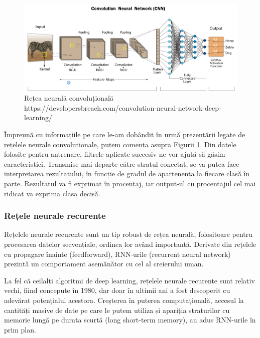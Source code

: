\documentclass[a4paper, 12pt]{report}
\begin{document}
	\clearpage
	\begin{figure}[h]
		\begin{center}
			\includegraphics[scale=0.29]{images/cnn.png}
		\end{center}
		\caption{Rețea neurală convoluțională\newline
			\hspace{\linewidth}https://developersbreach.com/convolution-neural-network-deep-learning/}
		\label{fig:cnn}
	\end{figure}
	
	Împreună cu informațiile pe care le-am dobândit în urmă prezentării legate de rețelele neurale convolutionale, putem comenta asupra Figurii \ref{fig:cnn}. Din datele folosite pentru antrenare, filtrele aplicate succesiv ne vor ajută să găsim caracteristici. Transmise mai departe către stratul conectat, se va putea face interpretarea rezultatului, în funcție de gradul de apartenența la fiecare clasă în parte. Rezultatul va fi exprimat în procentaj, iar output-ul cu procentajul cel mai ridicat va exprima clasa decisă.
	\clearpage
	\subsubsection{Rețele neurale recurente}
	Rețelele neurale recurente sunt un tip robust de rețea neurală, folositoare pentru procesarea datelor secvențiale, ordinea lor având importantă. Derivate din rețelele cu propagare înainte (feedforward), RNN-urile (recurrent neural network) prezintă un comportament asemănător cu cel al creierului uman.

	La fel că ceilalți algoritmi de deep learning, rețelele neurale recurente sunt relativ vechi, fiind concepute în 1980, dar doar în ultimii ani a fost descoperit cu adevărat potențialul acestora. Creșterea în puterea computațională, accesul la cantități masive de date pe care le putem utiliza și apariția straturilor cu memorie lungă pe durata scurtă (long short-term memory), au adus RNN-urile în prim plan.
\end{document}
